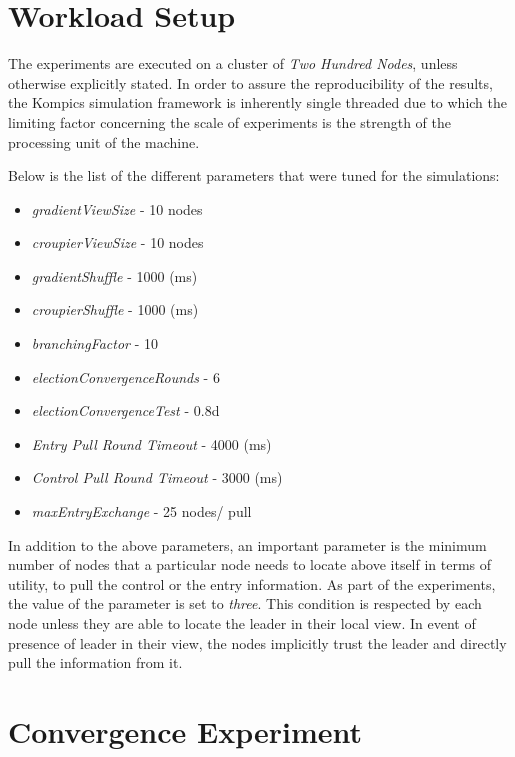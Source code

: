 \documentclass[a4paper,11pt]{kth-mag}
\begin{document}
\section{Workload Setup}

The experiments are executed on a cluster of \textit{Two Hundred Nodes}, unless otherwise explicitly stated. In order to assure the reproducibility of the results, the Kompics simulation framework is inherently single threaded due to which the limiting factor concerning the scale of experiments is the strength of the processing unit of the machine.

\par Below is the list of the different parameters that were tuned for the simulations:

\begin{itemize}
\setlength\itemsep{0em}
\item \textit{gradientViewSize} - 10 nodes
\item \textit{croupierViewSize} - 10 nodes
\item \textit{gradientShuffle} - 1000 (ms)
\item \textit{croupierShuffle} - 1000 (ms)
\item \textit{branchingFactor} - 10
\item \textit{electionConvergenceRounds} - 6
\item \textit{electionConvergenceTest} - 0.8d
\item \textit{Entry Pull Round Timeout} - 4000 (ms)
\item \textit{Control Pull Round Timeout} - 3000 (ms)
\item \textit{maxEntryExchange} - 25 nodes/ pull
\end{itemize}

In addition to the above parameters, an important parameter is the minimum number of nodes that a particular node needs to locate above itself in terms of utility, to pull the control or the entry information. As part of the experiments, the value of the parameter is set to \textit{three}. This condition is respected by each node unless they are able to locate the leader in their local view. In event of presence of leader in their view, the nodes implicitly trust the leader and  directly pull the information from it.


\section{Convergence Experiment}
\end{document}
